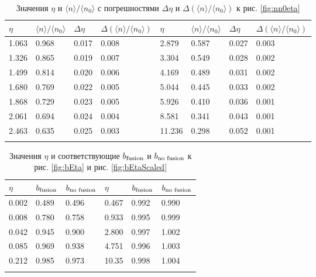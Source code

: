 {\footnotesize
\begin{longtable}{| l | l | l | l || l | l | l | l |}
	\hline
	$\eta$	&	$\langle n \rangle / \langle n_0 \rangle$	&	$\Delta \eta$	&	$\Delta (\langle n \rangle / \langle n_0 \rangle)$	&	$\eta$	&	$\langle n \rangle / \langle n_0 \rangle$	&	$\Delta \eta$	&	$\Delta (\langle n \rangle / \langle n_0 \rangle)$	\\
	\hline
	1.063	&	0.968	&	0.017	&	0.008	&	2.879	&	0.587	&	0.027	&	0.003	\\
	1.326	&	0.865	&	0.019	&	0.007	&	3.304	&	0.549	&	0.028	&	0.002	\\
	1.499	&	0.814	&	0.020	&	0.006	&	4.169	&	0.489	&	0.031	&	0.002	\\
	1.680	&	0.769	&	0.022	&	0.005	&	5.044	&	0.445	&	0.033	&	0.002	\\
	1.868	&	0.729	&	0.023	&	0.005	&	5.926	&	0.410	&	0.036	&	0.001	\\
	2.061	&	0.694	&	0.024	&	0.004	&	8.581	&	0.341	&	0.043	&	0.001	\\
	2.463	&	0.635	&	0.025	&	0.003	&	11.236	&	0.298	&	0.052	&	0.001	\\
	\hline
	\caption{Значения $\eta$ и $\langle n \rangle / \langle n_0 \rangle$ с погрешностями $\Delta \eta$ и $\Delta (\langle n \rangle / \langle n_0 \rangle)$ к рис. \ref{fig:nn0eta}} \label{tab:nn0eta}
\end{longtable}}

{\footnotesize
\begin{longtable}{| l | l | l || l | l | l |}
	\hline
	$\eta$	&	$b_{\textnormal{fusion}}$	&	$b_{\textnormal{no fusion}}$	&	$\eta$	&	$b_{\textnormal{fusion}}$	&	$b_{\textnormal{no fusion}}$	\\
	\hline
	0.002	&	0.489	&	0.496	&	0.467	&	0.992	&	0.990	\\
	0.008	&	0.780	&	0.758	&	0.933	&	0.995	&	0.999	\\
	0.042	&	0.945	&	0.900	&	2.800	&	0.997	&	1.002	\\
	0.085	&	0.969	&	0.938	&	4.751	&	0.996	&	1.003	\\
	0.212	&	0.985	&	0.973	&	10.35	&	0.998	&	1.004	\\
	\hline
	\caption{Значения $\eta$ и соответствующие $b_{\textnormal{fusion}}$ и $b_{\textnormal{no fusion}}$ к рис. \ref{fig:bEta} и рис. \ref{fig:bEtaScaled}} \label{tab:bEta}
\end{longtable}}

